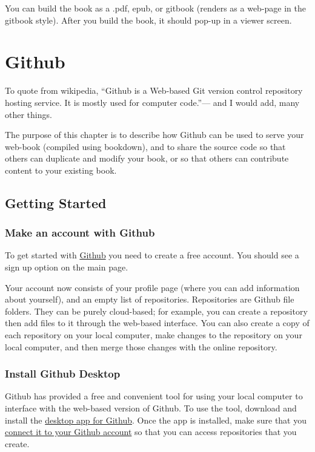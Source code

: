 \documentclass[]{book}
\theoremstyle{definition}
\theoremstyle{definition}
\theoremstyle{definition}
\theoremstyle{remark}
\begin{document}
You can build the book as a .pdf, epub, or gitbook (renders as a
web-page in the gitbook style). After you build the book, it should
pop-up in a viewer screen.

\chapter{Github}\label{github-1}

To quote from wikipedia, ``Github is a Web-based Git version control
repository hosting service. It is mostly used for computer code.''---
and I would add, many other things.

The purpose of this chapter is to describe how Github can be used to
serve your web-book (compiled using bookdown), and to share the source
code so that others can duplicate and modify your book, or so that
others can contribute content to your existing book.

\section{Getting Started}\label{getting-started}

\subsection{Make an account with
Github}\label{make-an-account-with-github}

To get started with \href{https://github.com}{Github} you need to create
a free account. You should see a sign up option on the main page.

Your account now consists of your profile page (where you can add
information about yourself), and an empty list of repositories.
Repositories are Github file folders. They can be purely cloud-based;
for example, you can create a repository then add files to it through
the web-based interface. You can also create a copy of each repository
on your local computer, make changes to the repository on your local
computer, and then merge those changes with the online repository.

\subsection{Install Github Desktop}\label{install-github-desktop}

Github has provided a free and convenient tool for using your local
computer to interface with the web-based version of Github. To use the
tool, download and install the \href{https://desktop.github.com}{desktop
app for Github}. Once the app is installed, make sure that you
\href{https://help.github.com/desktop/guides/getting-started-with-github-desktop/authenticating-to-github/}{connect
it to your Github account} so that you can access repositories that you
create.
\end{document}
